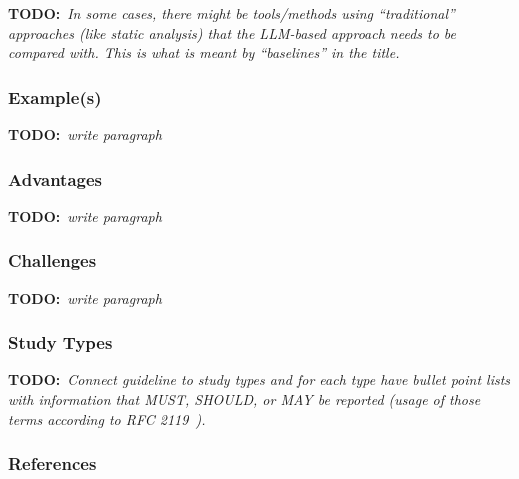 \documentclass[11pt]{article}
\newcommand{\todo}[1]{{\textbf{TODO:}\ \textit{#1}}} %
\begin{document}
\todo{In some cases, there might be tools/methods using ``traditional'' approaches (like static analysis) that the LLM-based approach needs to be compared with. This is what is meant by ``baselines'' in the title.}


\subsubsection{Example(s)}

\todo{write paragraph}


\subsubsection{Advantages}

\todo{write paragraph}


\subsubsection{Challenges}

\todo{write paragraph}


\subsubsection{Study Types}

\todo{Connect guideline to study types and for each type have bullet point lists with information that MUST, SHOULD, or MAY be reported (usage of those terms according to RFC 2119~\cite{rfc2119}).}


\subsubsection{References}



\end{document}
